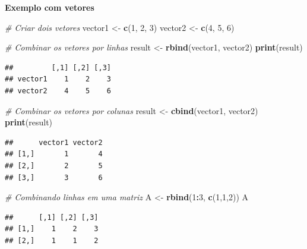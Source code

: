 \documentclass[
]{book}
\newenvironment{Shaded}{\begin{snugshade}}{\end{snugshade}}
\newcommand{\CommentTok}[1]{\textcolor[rgb]{0.56,0.35,0.01}{\textit{#1}}}
\newcommand{\DecValTok}[1]{\textcolor[rgb]{0.00,0.00,0.81}{#1}}
\newcommand{\FunctionTok}[1]{\textcolor[rgb]{0.13,0.29,0.53}{\textbf{#1}}}
\newcommand{\NormalTok}[1]{#1}
\newcommand{\OtherTok}[1]{\textcolor[rgb]{0.56,0.35,0.01}{#1}}
\newcommand{\SpecialCharTok}[1]{\textcolor[rgb]{0.81,0.36,0.00}{\textbf{#1}}}
\theoremstyle{definition}
\theoremstyle{definition}
\theoremstyle{definition}
\theoremstyle{definition}
\theoremstyle{remark}
\begin{document}
\textbf{Exemplo com vetores}

\begin{Shaded}
\begin{Highlighting}[]
\CommentTok{\# Criar dois vetores}
\NormalTok{vector1 }\OtherTok{\textless{}{-}} \FunctionTok{c}\NormalTok{(}\DecValTok{1}\NormalTok{, }\DecValTok{2}\NormalTok{, }\DecValTok{3}\NormalTok{)}
\NormalTok{vector2 }\OtherTok{\textless{}{-}} \FunctionTok{c}\NormalTok{(}\DecValTok{4}\NormalTok{, }\DecValTok{5}\NormalTok{, }\DecValTok{6}\NormalTok{)}

\CommentTok{\# Combinar os vetores por linhas}
\NormalTok{result }\OtherTok{\textless{}{-}} \FunctionTok{rbind}\NormalTok{(vector1, vector2)}
\FunctionTok{print}\NormalTok{(result)}
\end{Highlighting}
\end{Shaded}

\begin{verbatim}
##         [,1] [,2] [,3]
## vector1    1    2    3
## vector2    4    5    6
\end{verbatim}

\begin{Shaded}
\begin{Highlighting}[]
\CommentTok{\# Combinar os vetores por colunas}
\NormalTok{result }\OtherTok{\textless{}{-}} \FunctionTok{cbind}\NormalTok{(vector1, vector2)}
\FunctionTok{print}\NormalTok{(result)}
\end{Highlighting}
\end{Shaded}

\begin{verbatim}
##      vector1 vector2
## [1,]       1       4
## [2,]       2       5
## [3,]       3       6
\end{verbatim}

\begin{Shaded}
\begin{Highlighting}[]
\CommentTok{\# Combinando linhas em uma matriz}
\NormalTok{A }\OtherTok{\textless{}{-}} \FunctionTok{rbind}\NormalTok{(}\DecValTok{1}\SpecialCharTok{:}\DecValTok{3}\NormalTok{, }\FunctionTok{c}\NormalTok{(}\DecValTok{1}\NormalTok{,}\DecValTok{1}\NormalTok{,}\DecValTok{2}\NormalTok{))}
\NormalTok{A}
\end{Highlighting}
\end{Shaded}

\begin{verbatim}
##      [,1] [,2] [,3]
## [1,]    1    2    3
## [2,]    1    1    2
\end{verbatim}
\end{document}
